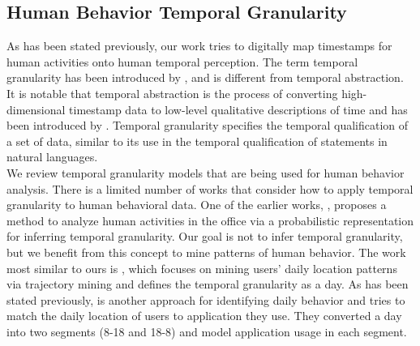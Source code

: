 \documentclass{sig-alternate}
\begin{document}
\subsection{Human Behavior Temporal Granularity }
As has been stated previously, our work tries to digitally map timestamps for human activities onto human temporal perception. The term temporal granularity has been introduced by \cite{tempgran},  and is different from temporal abstraction. It is notable that temporal abstraction is the process of converting high-dimensional timestamp data to low-level qualitative descriptions of time \cite{tempabssurv} and  has been introduced by \cite{kbabs}. Temporal granularity specifies the temporal qualification of a set of data, similar to its use in the temporal qualification of statements in natural languages. \\
We review temporal granularity models that are being used for human behavior analysis. There is a limited number of works that consider how to apply temporal granularity to human behavioral data. One of the earlier works, \cite{layrephactrec}, proposes a method to  analyze human activities in the office via a probabilistic representation for inferring temporal granularity. Our goal is not to infer temporal granularity, but we benefit from this concept to mine patterns of human behavior. The work most similar to ours is \cite{minindlochist},  which focuses on mining users' daily location patterns via trajectory mining and  defines the temporal granularity as a day. As has been stated previously, \cite{habitmin} is another approach for identifying daily behavior and tries to match the daily location of users to application they use. They converted a day into two segments (8-18 and 18-8) and model application usage in each segment.
\vfill{}
\end{document}
